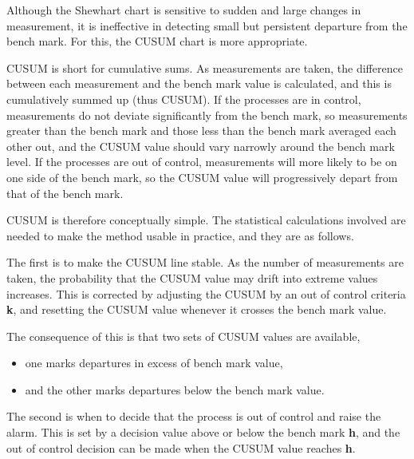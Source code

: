 \documentclass[SPC-MASTER.tex]{subfiles}
\begin{document}
Although the Shewhart chart is sensitive to sudden and large changes in measurement, it is ineffective in detecting small but persistent departure from the bench mark. For this, the CUSUM chart is more appropriate.

CUSUM is short for cumulative sums. As measurements are taken, the difference between each measurement and the bench mark value is calculated, and this is cumulatively summed up (thus CUSUM). If the processes are in control, measurements do not deviate significantly from the bench mark, so measurements greater than the bench mark and those less than the bench mark averaged each other out, and the CUSUM value should vary narrowly around the bench mark level. If the processes are out of control, measurements will more likely to be on one side of the bench mark, so the CUSUM value will progressively depart from that of the bench mark.

CUSUM is therefore conceptually simple. The statistical calculations involved are needed to make the method usable in practice, and they are as follows.

The first is to make the CUSUM line stable. As the number of measurements are taken, the probability that the CUSUM value may drift into extreme values increases. This is corrected by adjusting the CUSUM by an out of control criteria \textbf{k}, and resetting the CUSUM value whenever it crosses the bench mark value.

The consequence of this is that two sets of CUSUM values are available, 
\begin{itemize}
	\item one marks departures in excess of bench mark value, 
	\item and the other marks departures below the bench mark value.
\end{itemize}


The second is when to decide that the process is out of control and raise the alarm. This is set by a decision value above or below the bench mark \textbf{h}, and the out of control decision can be made when the CUSUM value reaches \textbf{h}.
\end{document}
